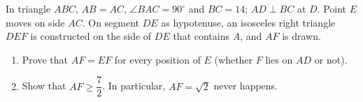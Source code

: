 In triangle $ABC$, $AB=AC$, $\angle BAC=90^\circ$ and $BC=14$; $AD\perp BC$ at $D$. Point $E$ moves on side $AC$. On segment $DE$ as hypotenuse, an isosceles right triangle $DEF$ is constructed on the side of $DE$ that contains $A$, and $AF$ is drawn.
\begin{enumerate}
\item[(a)] Prove that $AF=EF$ for every position of $E$ (whether $F$ lies on $AD$ or not).
\item[(b)] Show that $AF\ge\dfrac72$. In particular, $AF=\sqrt2$ never happens.
\end{enumerate}
